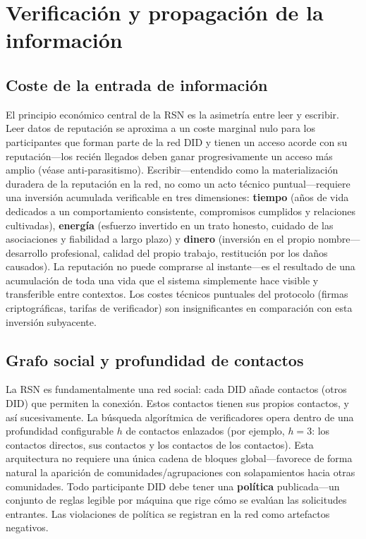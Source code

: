 \documentclass[11pt,a4paper,twocolumn]{article}
\begin{document}
\section{Verificación y propagación de la información}

\subsection{Coste de la entrada de información}

El principio económico central de la RSN es la asimetría entre leer y escribir. Leer datos de reputación se aproxima a un coste marginal nulo para los participantes que forman parte de la red DID y tienen un acceso acorde con su reputación---los recién llegados deben ganar progresivamente un acceso más amplio (véase anti-parasitismo). Escribir---entendido como la materialización duradera de la reputación en la red, no como un acto técnico puntual---requiere una inversión acumulada verificable en tres dimensiones: \textbf{tiempo} (años de vida dedicados a un comportamiento consistente, compromisos cumplidos y relaciones cultivadas), \textbf{energía} (esfuerzo invertido en un trato honesto, cuidado de las asociaciones y fiabilidad a largo plazo) y \textbf{dinero} (inversión en el propio nombre---desarrollo profesional, calidad del propio trabajo, restitución por los daños causados). La reputación no puede comprarse al instante---es el resultado de una acumulación de toda una vida que el sistema simplemente hace visible y transferible entre contextos. Los costes técnicos puntuales del protocolo (firmas criptográficas, tarifas de verificador) son insignificantes en comparación con esta inversión subyacente.

\subsection{Grafo social y profundidad de contactos}

La RSN es fundamentalmente una red social: cada DID añade contactos (otros DID) que permiten la conexión. Estos contactos tienen sus propios contactos, y así sucesivamente. La búsqueda algorítmica de verificadores opera dentro de una profundidad configurable $h$ de contactos enlazados (por ejemplo, $h=3$: los contactos directos, sus contactos y los contactos de los contactos). Esta arquitectura no requiere una única cadena de bloques global---favorece de forma natural la aparición de comunidades/agrupaciones con solapamientos hacia otras comunidades. Todo participante DID debe tener una \textbf{política} publicada---un conjunto de reglas legible por máquina que rige cómo se evalúan las solicitudes entrantes. Las violaciones de política se registran en la red como artefactos negativos.
\end{document}
